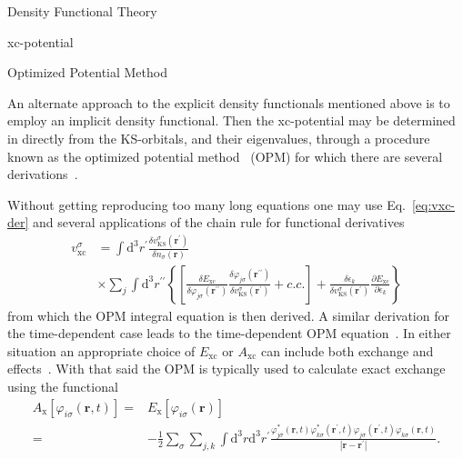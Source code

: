 \documentclass[letterpaper, 12 pt]{report}
\begin{document}
\begin{chapter}{Density Functional Theory \label{chap:dft}}
\begin{section}{xc-potential \label{sec:xcpot}}
      \begin{subsection}{Optimized Potential Method \label{sec:opm}}

         An alternate approach to the explicit density functionals mentioned above is to employ an
         implicit density functional. Then the xc-potential may be determined in directly from the
         KS-orbitals, and their eigenvalues, through a procedure known as the optimized potential
         method~\cite{opm1, opm2} (OPM) for which there are several derivations~\cite{opm1, opm2, opm3,
         opm4, opm5, opm-rev}.

         Without getting reproducing too many long equations one may use Eq.\ \eqref{eq:vxc-der} and
         several applications of the chain rule for functional derivatives
         \begin{equation} \label{eq:opm1}
            \begin{split}
               v^\sigma_\mathrm{xc} & = \int \mathrm{d}^3 r^\prime
                  \frac{\delta v^\sigma_\mathrm{KS}(\mathbf{r^\prime})}{\delta n_\sigma(\mathbf{r}) } \\
                                    & \times \sum\limits_{j} \int \mathrm{d}^3 r^{\prime\prime}
               \left\{ \left[ 
               \frac{\delta E_\mathrm{xc}}{\delta \varphi_{j\sigma}(\mathbf{r^{\prime\prime}}) }
               \frac{\delta \varphi_{j\sigma}(\mathbf{r^{\prime\prime}}) }
                    {\delta v^\sigma_\mathrm{KS}(\mathbf{r^{\prime}}) }
               + c.c.
            \right]
            + \frac{\delta \epsilon_k}{\delta v^\sigma_\mathrm{KS}(\mathbf{r^{\prime}})}
              \frac{\partial E_\mathrm{xc}}{\partial \epsilon_k}
            \right\}
            \end{split}
         \end{equation}
         from which the OPM integral equation is then derived. A similar derivation for the
         time-dependent case leads to the time-dependent OPM equation~\cite{tdopm}. In either situation
         an appropriate choice of $E_\mathrm{xc}$ or $A_\mathrm{xc}$ can include both exchange and
         effects~\cite{opm5, tdopm}. With that said the OPM is typically used to calculate exact
         exchange using the functional
         \begin{equation} \label{eq:xfunc}
            \begin{split}
               A_\mathrm{x}[\varphi_{i\sigma}(\mathbf{r},t)]
                 = & E_\mathrm{x}[\varphi_{i\sigma}(\mathbf{r})] \\
                = & -\frac{1}{2} \sum\limits_\sigma \sum\limits_{j,k}
                    \int\mathrm{d}^3 r \mathrm{d}^3 r^\prime
                    \frac{ \varphi^*_{j\sigma}(\mathbf{r},t) \varphi^*_{k\sigma}(\mathbf{r}^\prime,t)
                   \varphi_{j\sigma}(\mathbf{r}^\prime,t) \varphi_{k\sigma}(\mathbf{r},t)}
                   {\left| \mathbf{r} -\mathbf{r}^\prime \right|}.
            \end{split}
         \end{equation}


\end{subsection}
\end{section}
\end{chapter}
\end{document}
